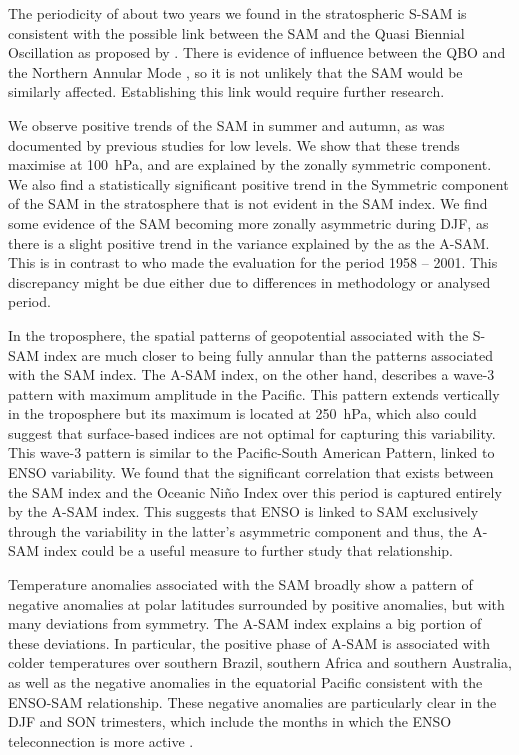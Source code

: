 \documentclass[smallextended]{svjour3}       %
\begin{document}
The periodicity of about two years we found in the stratospheric S\nobreakdash-SAM is consistent with the possible link between the SAM and the Quasi Biennial Oscillation as proposed by \citep{vasconcellos2020}.
There is evidence of influence between the QBO and the Northern Annular Mode \citep[e.g.][]{holton1980, watson2014, zhang2020}, so it is not unlikely that the SAM would be similarly affected.
Establishing this link would require further research.

We observe positive trends of the SAM in summer and autumn, as was documented by previous studies \citep[e.g.][ and references therein]{fogt2020} for low levels.
We show that these trends maximise at 100~hPa, and are explained by the zonally symmetric component.
We also find a statistically significant positive trend in the Symmetric component of the SAM in the stratosphere that is not evident in the SAM index.
We find some evidence of the SAM becoming more zonally asymmetric during DJF, as there is a slight positive trend in the variance explained by the as the A\nobreakdash-SAM.
This is in contrast to \citet{fogt2012} who made the evaluation for the period 1958 -- 2001.
This discrepancy might be due either due to differences in methodology or analysed period.

In the troposphere, the spatial patterns of geopotential associated with the S\nobreakdash-SAM index are much closer to being fully annular than the patterns associated with the SAM index.
The A\nobreakdash-SAM index, on the other hand, describes a wave-3 pattern with maximum amplitude in the Pacific.
This pattern extends vertically in the troposphere but its maximum is located at 250~hPa, which also could suggest that surface-based indices are not optimal for capturing this variability.
This wave-3 pattern is similar to the Pacific-South American Pattern, linked to ENSO variability.
We found that the significant correlation that exists between the SAM index and the Oceanic Niño Index over this period is captured entirely by the A\nobreakdash-SAM index.
This suggests that ENSO is linked to SAM exclusively through the variability in the latter's asymmetric component and thus, the A\nobreakdash-SAM index could be a useful measure to further study that relationship.

Temperature anomalies associated with the SAM broadly show a pattern of negative anomalies at polar latitudes surrounded by positive anomalies, but with many deviations from symmetry.
The A\nobreakdash-SAM index explains a big portion of these deviations.
In particular, the positive phase of A\nobreakdash-SAM is associated with colder temperatures over southern Brazil, southern Africa and southern Australia, as well as the negative anomalies in the equatorial Pacific consistent with the ENSO\nobreakdash-SAM relationship.
These negative anomalies are particularly clear in the DJF and SON trimesters, which include the months in which the ENSO teleconnection is more active \citep[e.g.][]{cai2020a}.
\end{document}
